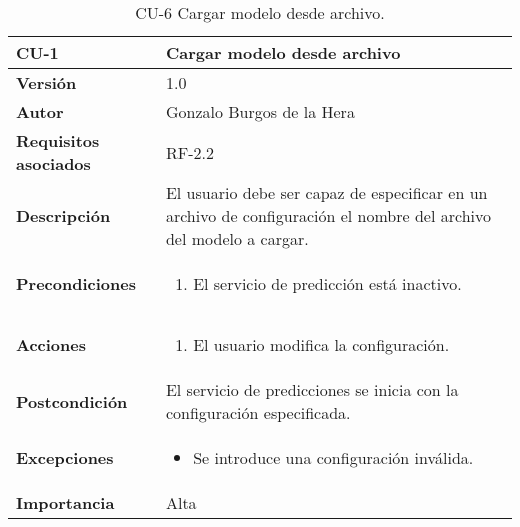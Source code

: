\begin{table}[H]
	\centering
	\begin{tabularx}{\linewidth}{ p{} p{} }
		\toprule
		\textbf{CU-1}    & \textbf{Cargar modelo desde archivo}\\
		\toprule
		\textbf{Versión}              & 1.0    \\
		\textbf{Autor}                & Gonzalo Burgos de la Hera \\
		\textbf{Requisitos asociados} & RF-2.2 \\
		\textbf{Descripción}          & El usuario debe ser capaz de especificar en un archivo de configuración el nombre del archivo del modelo a cargar. \\
		\textbf{Precondiciones}       & 
        \begin{enumerate}
			\def\labelenumi{\arabic{enumi}.}
			\tightlist
			\item El servicio de predicción está inactivo.
		\end{enumerate}\\
		\textbf{Acciones}             &
		\begin{enumerate}
			\def\labelenumi{\arabic{enumi}.}
			\tightlist
			\item El usuario modifica la configuración.
		\end{enumerate}\\
		\textbf{Postcondición}        & El servicio de predicciones se inicia con la configuración especificada. \\
		\textbf{Excepciones}          & 
        \begin{itemize}
			\tightlist
			\item Se introduce una configuración inválida.
        \end{itemize} \\
		\textbf{Importancia}          & Alta \\
		\bottomrule
	\end{tabularx}
	\caption{CU-6 Cargar modelo desde archivo.}
\end{table}

